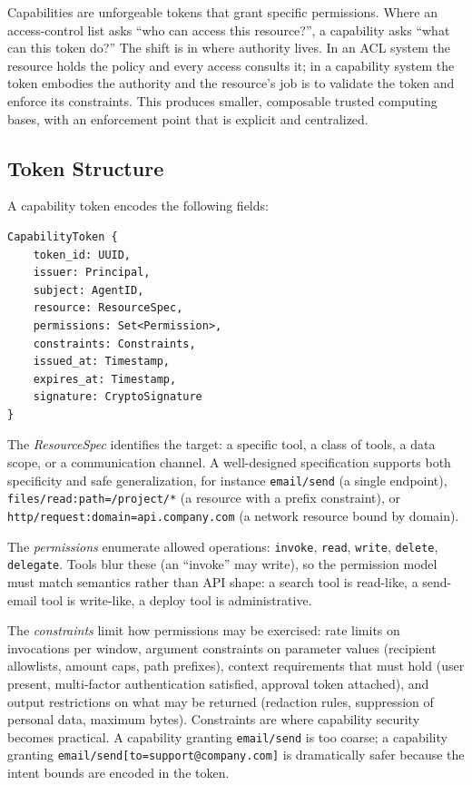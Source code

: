 \documentclass[11pt]{book}
\begin{document}
Capabilities are unforgeable tokens that grant specific permissions. Where an access-control list asks ``who can access this resource?'', a capability asks ``what can this token do?'' The shift is in where authority lives. In an ACL system the resource holds the policy and every access consults it; in a capability system the token embodies the authority and the resource's job is to validate the token and enforce its constraints. This produces smaller, composable trusted computing bases, with an enforcement point that is explicit and centralized.

\subsection{Token Structure}

A capability token encodes the following fields:
\begin{verbatim}
CapabilityToken {
    token_id: UUID,
    issuer: Principal,
    subject: AgentID,
    resource: ResourceSpec,
    permissions: Set<Permission>,
    constraints: Constraints,
    issued_at: Timestamp,
    expires_at: Timestamp,
    signature: CryptoSignature
}
\end{verbatim}

The \textit{ResourceSpec} identifies the target: a specific tool, a class of tools, a data scope, or a communication channel. A well-designed specification supports both specificity and safe generalization, for instance \texttt{email/send} (a single endpoint), \texttt{files/read:path=/project/*} (a resource with a prefix constraint), or \texttt{http/request:domain=api.company.com} (a network resource bound by domain).

The \textit{permissions} enumerate allowed operations: \texttt{invoke}, \texttt{read}, \texttt{write}, \texttt{delete}, \texttt{delegate}. Tools blur these (an ``invoke'' may write), so the permission model must match semantics rather than API shape: a search tool is read-like, a send-email tool is write-like, a deploy tool is administrative.

The \textit{constraints} limit how permissions may be exercised: rate limits on invocations per window, argument constraints on parameter values (recipient allowlists, amount caps, path prefixes), context requirements that must hold (user present, multi-factor authentication satisfied, approval token attached), and output restrictions on what may be returned (redaction rules, suppression of personal data, maximum bytes). Constraints are where capability security becomes practical. A capability granting \texttt{email/send} is too coarse; a capability granting \texttt{email/send[to=support@company.com]} is dramatically safer because the intent bounds are encoded in the token.
\end{document}
